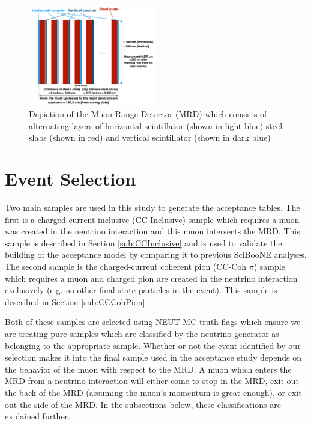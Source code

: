 \documentclass[11pt]{article}
\begin{document}
\begin{figure}[H]
\centering
\includegraphics[width=0.5\textwidth]{EventClassifications/mrd.png}
\caption{Depiction of the Muon Range Detector (MRD) which consists of alternating layers of horizontal scintillator (shown in light blue) steel slabs (shown in red) and vertical scintillator (shown in dark blue)}
\label{fig:mrddetector}
\end{figure}



\section{Event Selection}
\label{sec:eventselection}
Two main samples are used in this study to generate the acceptance tables. The first is a charged-current inclusive (CC-Inclusive) sample which requires a muon was created in the neutrino interaction and this muon intersects the MRD. This sample is described in Section \ref*{sub:CCInclusive} and is used to validate the building of the acceptance model by comparing it to previous SciBooNE analyses. The second sample is the charged-current coherent pion (CC-Coh $\pi$) sample which requires a muon and charged pion are created in the neutrino interaction exclusively (e.g. no other final state particles in the event). This sample is described in Section \ref*{sub:CCCohPion}.

Both of these samples are selected using NEUT MC-truth flags which ensure we are treating pure samples which are classified by the neutrino generator as belonging to the appropriate sample. Whether or not the event identified by our selection makes it into the final sample used in the acceptance study depends on the behavior of the muon with respect to the MRD. A muon which enters the MRD from a neutrino interaction will either come to stop in the MRD, exit out the back of the MRD (assuming the muon's momentum is great enough), or exit out the side of the MRD. In the subsections below, these classifications are explained further.
\end{document}
